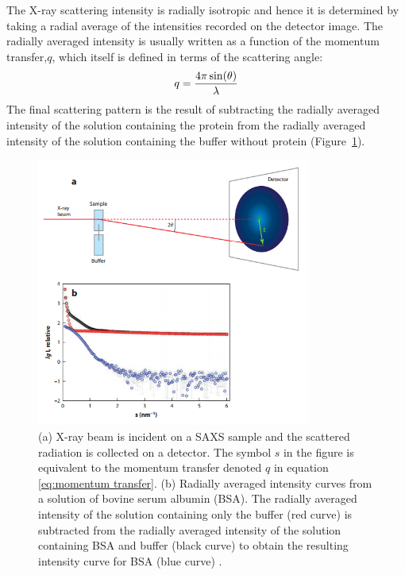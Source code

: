     The X-ray scattering intensity is radially isotropic and hence it is determined by taking a radial average of the intensities recorded on the detector image\cite{franke2015correlation}.
    The radially averaged intensity is usually written as a function of the momentum transfer,$q$, which itself is defined in terms of the scattering angle:
    \begin{equation}
        q = \frac{4 \pi \sin(\theta)}{\lambda}
        \label{eq:momentum transfer}
    \end{equation}
    The final scattering pattern is the result of subtracting the radially averaged intensity of the solution containing the protein from the radially averaged intensity of the solution containing the buffer without protein (Figure~\ref{fig:SAXS scattering curve}).
    \begin{figure}
        \centering
        \includegraphics[width=0.8\textwidth]{figures/introduction/SAXS_scattering.png}
        \caption{(a) X-ray beam is incident on a SAXS sample and the scattered radiation is collected on a detector.
        The symbol $s$ in the figure is equivalent to the momentum transfer denoted $q$ in equation \ref{eq:momentum transfer}.
        (b) Radially averaged intensity curves from a solution of bovine serum albumin (BSA).
        The radially averaged intensity of the solution containing only the buffer (red curve) is subtracted from the radially averaged intensity of the solution containing BSA and buffer (black curve) to obtain the resulting intensity curve for BSA (blue curve) \cite{blanchet2013small}.}
        \label{fig:SAXS scattering curve}
    \end{figure}

